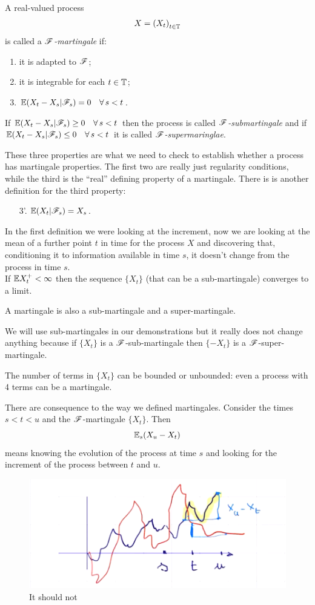 \documentclass{report}
\begin{document}
\begin{definition}
	A real-valued process
	\[X={(X_t)}_{t\in\mathbb{T}}\]
	is called a \emph{$\mathscr{F}$-martingale} if:
	\begin{enumerate}
		\item it is adapted to $\mathscr{F}$;
		\item it is integrable for each $t\in\mathbb{T}$;
		\item $\mathbb{E}(X_t-X_s|\mathscr{F}_s)=0\quad\forall\, s<t$.
	\end{enumerate}
	If $\mathbb{E}(X_t-X_s|\mathscr{F}_s)\geq0\quad\forall\, s<t$ then the process is called \emph{$\mathscr{F}$-submartingale} and if $\mathbb{E}(X_t-X_s|\mathscr{F}_s)\leq0\quad\forall\, s<t$ it is called \emph{$\mathscr{F}$-supermaringlae}.
\end{definition}
These three properties are what we need to check to establish whether a process has martingale properties. The first two are really just regularity conditions, while the third is the ``real'' defining property of a martingale. There is is another definition for the third property:
\begin{definition}
	\begin{enumerate}
		\item[3'.] $\mathbb{E}(X_t|\mathscr{F}_s)=X_s$.
	\end{enumerate}
\end{definition}
In the first definition we were looking at the increment, now we are looking at the mean of a further point $t$ in time for the process $X$ and discovering that, conditioning it to information available in time $s$, it doesn't change from the process in time $s$.\\
If $\mathbb{E} X^{+}_{t}<\infty$ then the sequence $\{X_t\}$ (that can be a sub-martingale) converges to a limit. 
\begin{remark}
	A martingale is also a sub-martingale and a super-martingale.
\end{remark}
We will use sub-martingales in our demonstrations but it really does not change anything because if $\{X_t\}$ is a $\mathscr{F}$-sub-martingale then $\{-X_t\}$ is a $\mathscr{F}$-super-martingale.
\begin{remark}
	The number of terms in $\{X_t\}$ can be bounded or unbounded: even a process with 4 terms can be a martingale.
\end{remark}
There are consequence to the way we defined martingales. Consider the times $s<t<u$ and the $\mathscr{F}$-martingale $\{X_t\}$. Then
\[\mathbb{E}_s(X_u-X_{t})\]
means knowing the evolution of the process at time $s$ and looking for the increment of the process between $t$ and $u$. 
\begin{figure}[H]
	\centering
	\includegraphics[width=0.7\linewidth]{screenshot013}
	\caption{It should not}
	\label{fig:screenshot013}
\end{figure}
\end{document}
